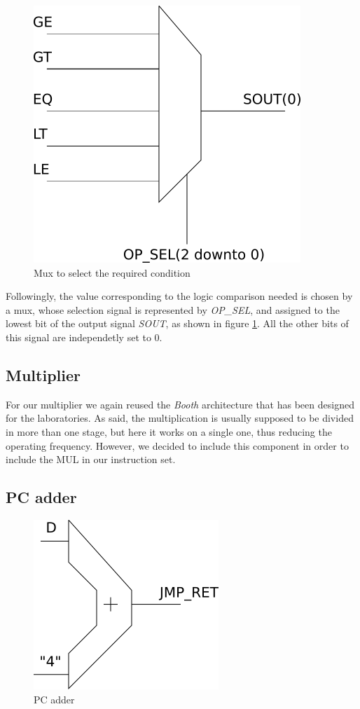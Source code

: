 \begin{figure}
	\centering
	\includegraphics[scale=0.6]{chapters/figures/comp_mux}
	\caption{Mux to select the required condition}
	\label{comp_mux_fig}
\end{figure}


Followingly, the value corresponding to the logic comparison needed is chosen by a mux, whose selection signal is represented by \textit{OP\_SEL}, and assigned to the lowest bit of the output signal \textit{SOUT}, as shown in figure \ref{comp_mux_fig}. All the other bits of this signal are independetly set to $0$.

\subsection{Multiplier}

For our multiplier we again reused the \textit{Booth} architecture that has been designed for the laboratories. As said, the multiplication is usually supposed to be divided in more than one stage, but here it works on a single one, thus reducing the operating frequency. However, we decided to include this component in order to include the MUL in our instruction set. 

\subsection{PC adder}
\noindent
\begin{figure}
	\begin{center}
		\includegraphics[scale=0.6]{chapters/figures/pc_add}
	\end{center}
	\caption{PC adder}
	\label{pc_add_fig}
\end{figure}

